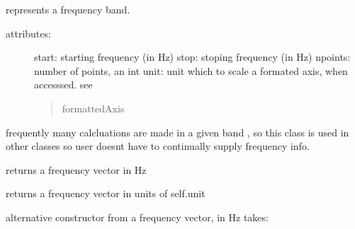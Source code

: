 \documentclass[letterpaper,10pt,english]{sphinxmanual}
\begin{document}
\begin{fulllineitems}
\label{auto_frequency:mwavepy.Frequency}
represents a frequency band.
\begin{description}
\item[{attributes:}] \leavevmode
start: starting frequency  (in Hz)
stop: stoping frequency  (in Hz)
npoints: number of points, an int
unit: unit which to scale a formated axis, when accesssed. see
\begin{quote}

formattedAxis
\end{quote}

\end{description}

frequently many calcluations are made in a given band , so this class 
is used in other classes so user doesnt have to continually supply 
frequency info.

\begin{fulllineitems}
\label{auto_frequency:mwavepy.Frequency.center}
\end{fulllineitems}


\begin{fulllineitems}
\label{auto_frequency:mwavepy.Frequency.f}
returns a frequency vector  in Hz

\end{fulllineitems}


\begin{fulllineitems}
\label{auto_frequency:mwavepy.Frequency.f_scaled}
returns a frequency vector in units of self.unit

\end{fulllineitems}


\begin{fulllineitems}
\label{auto_frequency:mwavepy.Frequency.from_f}
alternative constructor from a frequency vector, in Hz
takes:
\begin{quote}


\end{quote}
\end{fulllineitems}
\end{fulllineitems}
\end{document}
